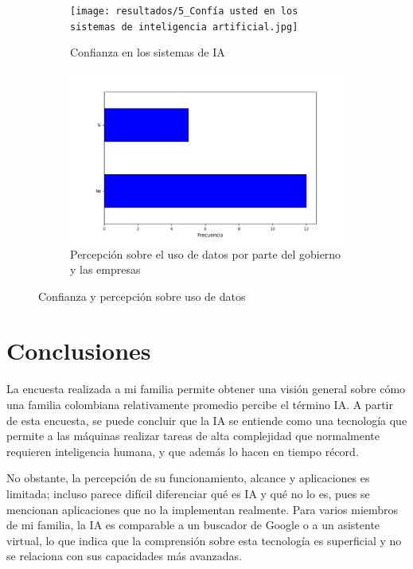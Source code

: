 \documentclass[12pt,a4paper]{article}
\begin{document}
\begin{figure}[h!]
    \centering
    \begin{subfigure}{0.45\linewidth}
        \centering
        \texttt{[image: resultados/5\_Confía usted en los sistemas de inteligencia artificial.jpg]}
        \caption{Confianza en los sistemas de IA}
        \label{fig:f5}
    \end{subfigure}
    \hfill
    \begin{subfigure}{0.45\linewidth}
        \centering
        \includegraphics[width=\linewidth]{resultados/10_Cree que el gobierno o las empresas están utilizando los datos eficazmente para mejorar estas áreas.jpg}
        \caption{Percepción sobre el uso de datos por parte del gobierno y las empresas}
        \label{fig:f6}
    \end{subfigure}
    \caption{Confianza y percepción sobre uso de datos}
\end{figure}

\section*{Conclusiones}
La encuesta realizada a mi familia permite obtener una visión general sobre cómo una familia colombiana
relativamente promedio percibe el término IA. A partir de esta encuesta, se puede concluir que la IA se entiende como 
una tecnología que permite a las máquinas realizar tareas de alta complejidad que normalmente requieren inteligencia humana,
y que además lo hacen en tiempo récord. 

No obstante, la percepción de su funcionamiento, alcance y aplicaciones es limitada; incluso parece difícil 
diferenciar qué es IA y qué no lo es, pues se mencionan aplicaciones que no la implementan realmente. 
Para varios miembros de mi familia, la IA es comparable a un buscador de Google o a un asistente virtual, 
lo que indica que la comprensión sobre esta tecnología es superficial y no se relaciona con sus capacidades más avanzadas.
\end{document}
